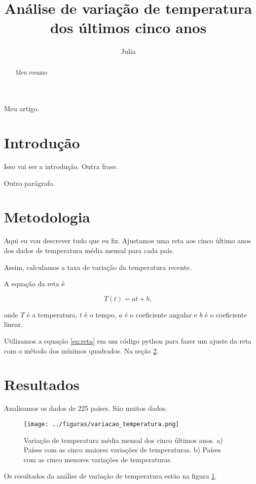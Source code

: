 \documentclass{article}
\begin{document}
\title{Análise de variação de temperatura dos últimos cinco anos}
\author{Julia}

\maketitle 

\begin{abstract}
Meu resumo 
\end{abstract}
	Meu artigo. 
	
\section{Introdução}
Isso vai ser a introdução.
Outra frase.

Outro parágrafo. %

\section{Metodologia}
\label{sec:metodos}

Aqui eu vou descrever tudo que eu fiz. Ajustamos uma reta aos cinco último anos dos dados 
de temperatura média mensal para cada país. 

Assim, calculamos a taxa de variação da temperatura recente. 


A equação da reta é 

\begin{equation}
T(t) = a t + b, 
\label{eq:reta}
\end{equation}

\noindent
onde $T$ é a temperatura, $t$ é o tempo, $a$ é o coeficiente angular e $b$ é o coeficiente linear. 

Utilizamos a equação \ref{eq:reta} em um código python para fazer um ajuste da reta com o método dos mínimos quadrados. Na seção \ref{sec:metodos}.

\section{Resultados}

Analisamos os dados de 225 países. São muitos dados. 

\begin{figure}[!htb] %
\centering 
\texttt{[image: ../figuras/variacao\_temperatura.png]} %
\caption{Variação de temperatura média mensal dos cinco últimos anos. a) Países com as cinco maiores variações de temperaturas. 
b) Países com as cinco menores variações de temperaturas.}
\label{fig:variacao}
\end{figure}

Os resultados da análise de variação de temperatura estão na figura \ref{fig:variacao}.
\end{document}
